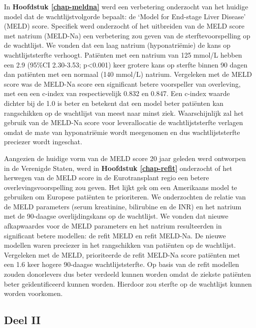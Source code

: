 \documentclass[11pt,english,]{book} %
\begin{document}
In \textbf{Hoofdstuk \ref{chap-meldna}} werd een verbetering onderzocht van het huidige model dat de wachtlijstvolgorde bepaalt: de `Model for End-stage Liver Disease' (MELD) score. Specifiek werd onderzocht of het uitbreiden van de MELD score met natrium (MELD-Na) een verbetering zou geven van de sterftevoorspelling op de wachtlijst. We vonden dat een laag natrium (hyponatriëmie) de kans op wachtlijststerfte verhoogt. Patiënten met een natrium van 125 mmol/L hebben een 2.9 (95\%CI 2.30-3.53; p\textless0.001) keer grotere kans op sterfte binnen 90 dagen dan patiënten met een normaal (140 mmol/L) natrium. Vergeleken met de MELD score was de MELD-Na score een significant betere voorspeller van overleving, met een een c-index van respectievelijk 0.832 en 0.847. Een c-index waarde dichter bij de 1.0 is beter en betekent dat een model beter patiënten kan rangschikken op de wachtlijst van meest naar minst ziek. Waarschijnlijk zal het gebruik van de MELD-Na score voor leverallocatie de wachtlijststerfte verlagen omdat de mate van hyponatriëmie wordt meegenomen en dus wachtlijststerfte preciezer wordt ingeschat.

Aangezien de huidige vorm van de MELD score 20 jaar geleden werd ontworpen in de Verenigde Staten, werd in \textbf{Hoofdstuk \ref{chap-refit}} onderzocht of het herwegen van de MELD score in de Eurotransplant regio een betere overlevingsvoorspelling zou geven. Het lijkt gek om een Amerikaans model te gebruiken om Europese patiënten te prioriteren. We onderzochten de relatie van de MELD parameters (serum kreatinine, bilirubine en de INR) en het natrium met de 90-daagse overlijdingskans op de wachtlijst. We vonden dat nieuwe afkapwaardes voor de MELD parameters en het natrium resulteerden in significant betere modellen: de refit MELD en refit MELD-Na. De nieuwe modellen waren preciezer in het rangschikken van patiënten op de wachtlijst. Vergeleken met de MELD, prioriteerde de refit MELD-Na score patiënten met een 1.6 keer hogere 90-daagse wachtlijststerfte. Op basis van de refit modellen zouden donorlevers dus beter verdeeld kunnen worden omdat de ziekste patiënten beter geïdentificeerd kunnen worden. Hierdoor zou sterfte op de wachtlijst kunnen worden voorkomen.

\hypertarget{deel-ii}{%
\subsection*{Deel II}\label{deel-ii}}
\end{document}

